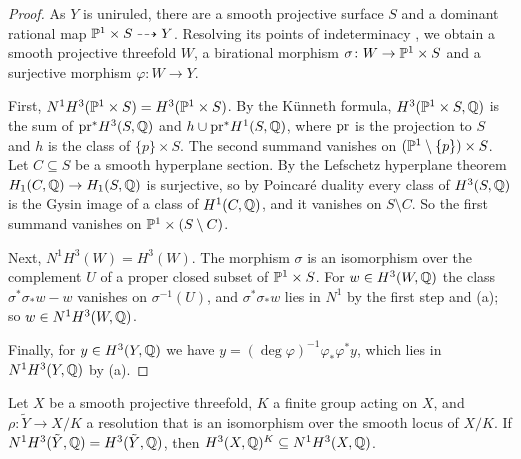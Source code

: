 \begin{proof}
As $Y$ is uniruled, there are a smooth projective surface $S$ and a dominant
rational map $\mathbb{P}^{1}\times S\dashrightarrow Y$. Resolving its points of
indeterminacy \cite{Hir64}, we obtain a smooth projective threefold $W$, a
birational morphism $\sigma\colon W\to\mathbb{P}^{1}\times S$ and a surjective
morphism $\varphi\colon W\to Y$.

First, $N^{1}H^{3}(\mathbb{P}^{1}\times S)=H^{3}(\mathbb{P}^{1}\times S)$. By the
K\"unneth formula, $H^{3}(\mathbb{P}^{1}\times S,\mathbb{Q})$ is the sum of
$\mathrm{pr}^{*}H^{3}(S,\mathbb{Q})$ and $h\cup\mathrm{pr}^{*}H^{1}(S,\mathbb{Q})$, where $\mathrm{pr}$ is the
projection to $S$ and $h$ is the class of $\{p\}\times S$. The second
summand vanishes on $(\mathbb{P}^{1}\setminus\{p\})\times S$. Let $C\subseteq S$ be
a smooth hyperplane section. By the Lefschetz hyperplane theorem $H_{1}(C,
\mathbb{Q})\to H_{1}(S,\mathbb{Q})$ is surjective, so by Poincar\'e duality every class of
$H^{3}(S,\mathbb{Q})$ is the Gysin image of a class of $H^{1}(C,\mathbb{Q})$, and it
vanishes on $S\setminus C$. So the first summand vanishes on $\mathbb{P}^{1}\times
(S\setminus C)$.

Next, $N^{1}H^{3}(W)=H^{3}(W)$. The morphism $\sigma$ is an isomorphism over
the complement $U$ of a proper closed subset of $\mathbb{P}^{1}\times S$. For $w\in
H^{3}(W,\mathbb{Q})$ the class $\sigma^{*}\sigma_{*}w-w$ vanishes on $\sigma^{-1}(U)$,
and $\sigma^{*}\sigma_{*}w$ lies in $N^{1}$ by the first step and
(a); so $w\in N^{1}H^{3}(W,\mathbb{Q})$.

Finally, for $y\in H^{3}(Y,\mathbb{Q})$ we have $y=(\deg\varphi)^{-1}\varphi_{*}
\varphi^{*}y$, which lies in $N^{1}H^{3}(Y,\mathbb{Q})$ by (a).
\end{proof}

\begin{lemma}\label{lem:quotientN1}
Let $X$ be a smooth projective threefold, $K$ a finite group acting on $X$,
and $\rho\colon\tilde Y\to X/K$ a resolution that is an isomorphism over the
smooth locus of $X/K$. If $N^{1}H^{3}(\tilde Y,\mathbb{Q})=H^{3}(\tilde Y,\mathbb{Q})$,
then $H^{3}(X,\mathbb{Q})^{K}\subseteq N^{1}H^{3}(X,\mathbb{Q})$.
\end{lemma}

